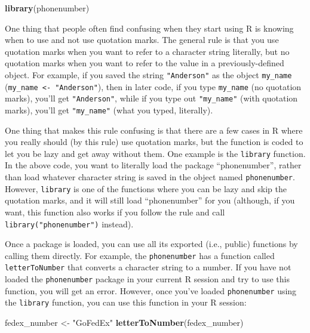 \documentclass[]{book}
\makeatletter
\newenvironment{Shaded}{\begin{snugshade}}{\end{snugshade}}
\newcommand{\KeywordTok}[1]{\textcolor[rgb]{0.13,0.29,0.53}{\textbf{#1}}}
\newcommand{\StringTok}[1]{\textcolor[rgb]{0.31,0.60,0.02}{#1}}
\newcommand{\NormalTok}[1]{#1}
\newenvironment{kframe}{%
\medskip{}
\setlength{\fboxsep}{.8em}
 \def\at@end@of@kframe{}%
 \ifinner\ifhmode%
  \def\at@end@of@kframe{\end{minipage}}%
  \begin{minipage}{\columnwidth}%
 \fi\fi%
 \def\FrameCommand##1{\hskip\@totalleftmargin \hskip-\fboxsep
 \colorbox{shadecolor}{##1}\hskip-\fboxsep
     \hskip-\linewidth \hskip-\@totalleftmargin \hskip\columnwidth}%
 \MakeFramed {\advance\hsize-\width
   \@totalleftmargin\z@ \linewidth\hsize
   \@setminipage}}%
 {\par\unskip\endMakeFramed%
 \at@end@of@kframe}
\renewenvironment{Shaded}{\begin{kframe}}{\end{kframe}}
\newenvironment{rmdblock}[1]
  {
  \begin{itemize}
  \renewcommand{\labelitemi}{
    \raisebox{-.7\height}[0pt][0pt]{
      {\setkeys{Gin}{width=3em,keepaspectratio}\texttt{[image: images/\#1]}}
    }
  }
  \setlength{\fboxsep}{1em}
  \begin{kframe}
  \item
  }
  {
  \end{kframe}
  \end{itemize}
  }
\newenvironment{rmdtip}
  {\begin{rmdblock}{tip}}
  {\end{rmdblock}}
\theoremstyle{definition}
\theoremstyle{definition}
\theoremstyle{definition}
\theoremstyle{remark}
\makeatother
\begin{document}
\begin{Shaded}
\begin{Highlighting}[]
\KeywordTok{library}\NormalTok{(phonenumber)}
\end{Highlighting}
\end{Shaded}

\begin{rmdtip}
One thing that people often find confusing when they start using R is
knowing when to use and not use quotation marks. The general rule is
that you use quotation marks when you want to refer to a character
string literally, but no quotation marks when you want to refer to the
value in a previously-defined object. For example, if you saved the
string \texttt{"Anderson"} as the object \texttt{my\_name}
(\texttt{my\_name\ \textless{}-\ "Anderson"}), then in later code, if
you type \texttt{my\_name} (no quotation marks), you'll get
\texttt{"Anderson"}, while if you type out \texttt{"my\_name"} (with
quotation marks), you'll get \texttt{"my\_name"} (what you typed,
literally).

One thing that makes this rule confusing is that there are a few cases
in R where you really should (by this rule) use quotation marks, but the
function is coded to let you be lazy and get away without them. One
example is the \texttt{library} function. In the above code, you want to
literally load the package ``phonenumber'', rather than load whatever
character string is saved in the object named \texttt{phonenumber}.
However, \texttt{library} is one of the functions where you can be lazy
and skip the quotation marks, and it will still load ``phonenumber'' for
you (although, if you want, this function also works if you follow the
rule and call \texttt{library("phonenumber")} instead).
\end{rmdtip}

Once a package is loaded, you can use all its exported (i.e., public)
functions by calling them directly. For example, the
\texttt{phonenumber} has a function called \texttt{letterToNumber} that
converts a character string to a number. If you have not loaded the
\texttt{phonenumber} package in your current R session and try to use
this function, you will get an error. However, once you've loaded
\texttt{phonenumber} using the \texttt{library} function, you can use
this function in your R session:

\begin{Shaded}
\begin{Highlighting}[]
\NormalTok{fedex_number <-}\StringTok{ "GoFedEx"}
\KeywordTok{letterToNumber}\NormalTok{(fedex_number)}
\end{Highlighting}
\end{Shaded}
\end{document}
